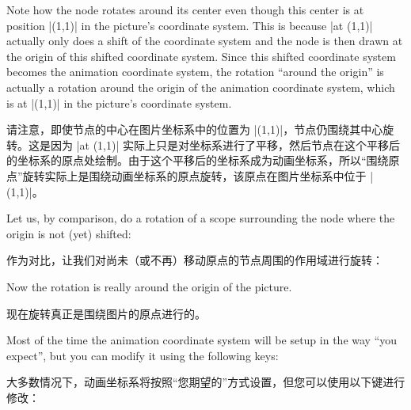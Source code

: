 \begin{codeexample}[
    preamble={\usetikzlibrary{animations}},
    animation list={0.5,1,1.5,2},
]
\end{codeexample}
%
Note how the node rotates around its center even though this center is at
position |(1,1)| in the picture's coordinate system. This is because |at (1,1)|
actually only does a shift of the coordinate system and the node is then drawn
at the origin of this shifted coordinate system. Since this shifted coordinate
system becomes the animation coordinate system, the rotation ``around the
origin'' is actually a rotation around the origin of the animation coordinate
system, which is at |(1,1)| in the picture's coordinate system.

请注意，即使节点的中心在图片坐标系中的位置为 |(1,1)|，节点仍围绕其中心旋转。这是因为 |at (1,1)| 实际上只是对坐标系进行了平移，然后节点在这个平移后的坐标系的原点处绘制。由于这个平移后的坐标系成为动画坐标系，所以“围绕原点”旋转实际上是围绕动画坐标系的原点旋转，该原点在图片坐标系中位于 |(1,1)|。

Let us, by comparison, do a rotation of a scope surrounding the node where the
origin is not (yet) shifted:

作为对比，让我们对尚未（或不再）移动原点的节点周围的作用域进行旋转：


\begin{codeexample}[
    preamble={\usetikzlibrary{animations}},
    animation list={0.5,1,1.5,2},
]
\end{codeexample}
%
Now the rotation is really around the origin of the picture.

现在旋转真正是围绕图片的原点进行的。

Most of the time the animation coordinate system will be setup in the way ``you
expect'', but you can modify it using the following keys:

大多数情况下，动画坐标系将按照“您期望的”方式设置，但您可以使用以下键进行修改：

